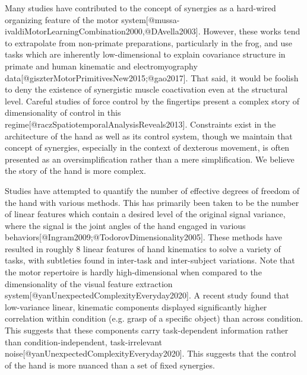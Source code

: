 \documentclass[../main.tex]{subfiles}
\begin{document}
{Many studies have contributed to the concept of synergies as a hard-wired organizing feature of the motor system[@mussa-ivaldiMotorLearningCombination2000,@DAvella2003]. However, these works tend to extrapolate from non-primate preparations, particularly in the frog, and use tasks which are inherently low-dimensional to explain covariance structure in primate and human kinematic and electromyography data[@giszterMotorPrimitivesNew2015;@gao2017]. That said, it would be foolish to deny the existence of synergistic muscle coactivation even at the structural level. Careful studies of force control by the fingertips present a complex story of dimensionality of control in this regime[@raczSpatiotemporalAnalysisReveals2013]. Constraints exist in the architecture of the hand as well as its control system, though we maintain that concept of synergies, especially in the context of dexterous movement, is often presented as an oversimplification rather than a mere simplification. We believe the story of the hand is more complex.

Studies have attempted to quantify the number of effective degrees of freedom of the hand with various methods. This has primarily been taken to be the number of linear features which contain a desired level of the original signal variance, where the signal is the joint angles of the hand engaged in various behaviors[@Ingram2009;@TodorovDimensionality2005]. These methods have resulted in roughly 8 linear features of hand kinematics to solve a variety of tasks, with subtleties found in inter-task and inter-subject variations. Note that the motor repertoire is hardly high-dimensional when compared to the dimensionality of the visual feature extraction system[@yanUnexpectedComplexityEveryday2020]. A recent study found that low-variance linear, kinematic components displayed significantly higher correlation within condition (e.g. grasp of a specific object) than across condition. This suggests that these components carry task-dependent information rather than condition-independent, task-irrelevant noise[@yanUnexpectedComplexityEveryday2020]. This suggests that the control of the hand is more nuanced than a set of fixed synergies.

}
\end{document}
